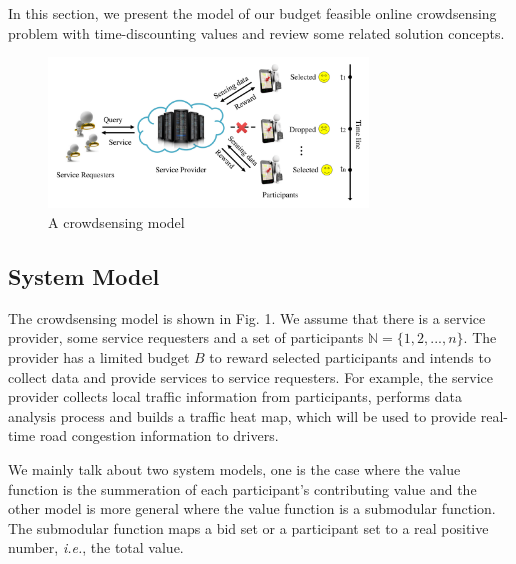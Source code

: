 \documentclass[10pt,journal,letterpaper,compsoc]{IEEEtran}
\newcommand{\ie}{{\em i.e.}}
\begin{document}
In this section, we present the model of our budget feasible online crowdsensing problem with time-discounting values and review some related solution concepts.
\begin{figure}[!ht]
\centering
\includegraphics[width=8.5cm]{system2.pdf}
\vspace{-0.3cm}
\caption{A crowdsensing model}
\vspace{-0.5cm}
\end{figure}

\subsection{System Model}
The crowdsensing model is shown in Fig. 1. We assume that there is a service provider, some service requesters and a set of participants $\mathbb{N}=\{1,2,..., n\}.$ The provider has a limited budget $B$ to reward selected participants and intends to collect data and  provide services to service requesters. For example, the service provider collects local traffic information from participants, performs data analysis process and builds a traffic heat map, which will be used to provide real-time road congestion information to drivers.

We mainly talk about two system models, one is the case where the value function is the summeration of each participant's contributing value and the other model is more general where the value function is a submodular function. The submodular function maps a bid set or a participant set to a real positive number, \ie, the total value.
\end{document}
